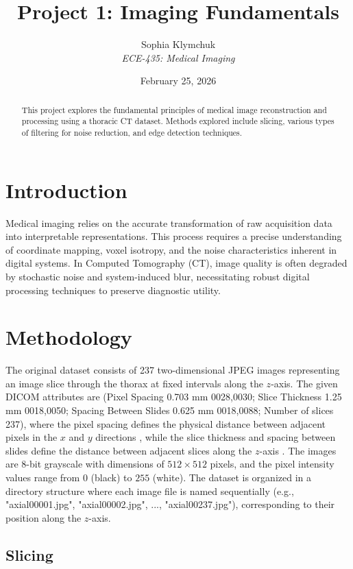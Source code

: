 \documentclass[10pt, twocolumn]{article}
\title{\textbf{Project 1: Imaging Fundamentals}}
\author{Sophia Klymchuk \\ \textit{ECE-435: Medical Imaging}}
\date{February 25, 2026}
\begin{document}
\maketitle

\begin{abstract}
This project explores the fundamental principles of medical image reconstruction and processing using a thoracic CT dataset. Methods explored include slicing, various types of filtering for noise reduction, and edge detection techniques.
\end{abstract} 

\section{Introduction}
Medical imaging relies on the accurate transformation of raw acquisition data into interpretable representations. This process requires a precise understanding of coordinate mapping, voxel isotropy, and the noise characteristics inherent in digital systems. In Computed Tomography (CT), image quality is often degraded by stochastic noise and system-induced blur, necessitating robust digital processing techniques to preserve diagnostic utility.

\section{Methodology}
The original dataset \cite{Mulrecon} consists of 237 two-dimensional JPEG images representing an image slice through the thorax at fixed intervals along the $z$-axis. The given DICOM attributes are (Pixel Spacing 0.703 mm 0028,0030; Slice Thickness 1.25 mm 0018,0050; Spacing Between Slides 0.625 mm 0018,0088; Number of slices 237), where the pixel spacing defines the physical distance between adjacent pixels in the $x$ and $y$ directions \cite{PixelSpacingAttribute}, while the slice thickness and spacing between slides define the distance between adjacent slices along the $z$-axis \cite{SliceThicknessAttribute}. The images are 8-bit grayscale with dimensions of $512 \times 512$ pixels, and the pixel intensity values range from $0$ (black) to $255$ (white). The dataset is organized in a directory structure where each image file is named sequentially (e.g., "axial00001.jpg", "axial00002.jpg", ..., "axial00237.jpg"), corresponding to their position along the $z$-axis. 

\subsection{Slicing}
\end{document}
